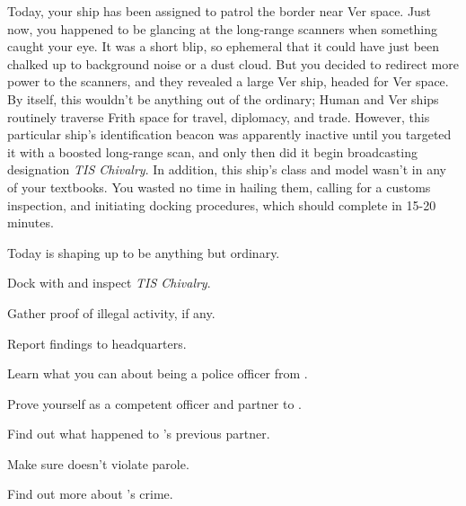 \documentclass[char]{guildcamp4}
\begin{document}
Today, your ship has been assigned to patrol the border near Ver space. Just now, you happened to be glancing at the long-range scanners when something caught your eye. It was a short blip, so ephemeral that it could have just been chalked up to background noise or a dust cloud. But you decided to redirect more power to the scanners, and they revealed a large Ver ship, headed for Ver space. By itself, this wouldn't be anything out of the ordinary; Human and Ver ships routinely traverse Frith space for travel, diplomacy, and trade. However, this particular ship's identification beacon was apparently inactive until you targeted it with a boosted long-range scan, and only then did it begin broadcasting designation \textit{TIS Chivalry}. In addition, this ship's class and model wasn't in any of your textbooks. You wasted no time in hailing them, calling for a customs inspection, and initiating docking procedures, which should complete in 15-20 minutes.

Today is shaping up to be anything but ordinary.

\begin{itemz}[Goals]
	\item Dock with and inspect \textit{TIS Chivalry}.
	\item Gather proof of illegal activity, if any.
	\item Report findings to headquarters.
	\item Learn what you can about being a police officer from \cCbad{}.
	\item Prove yourself as a competent officer and partner to \cCbad{}.
	\item Find out what happened to \cCbad{}'s previous partner.
	\item Make sure \cPilot{} doesn't violate  parole. 
	\item Find out more about \cPilot{}'s crime.
\end{itemz}

\begin{itemz}[Notes]
	\item 
\end{itemz}

\begin{contacts}
	\contact{\cTest{}}
\end{contacts}
\end{document}
